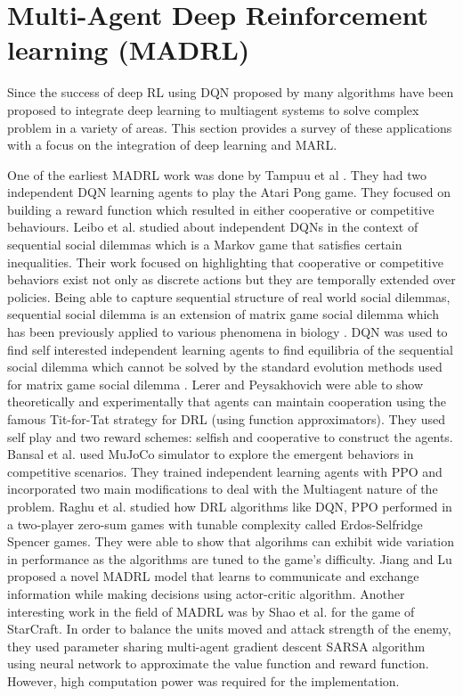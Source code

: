 \documentclass[12pt]{report}
\begin{document}
\section{Multi-Agent Deep Reinforcement learning (MADRL)}

Since the success of deep RL using DQN proposed by \cite{Kavukcuoglu} many algorithms have been proposed to integrate deep learning to multiagent systems to solve complex problem in a variety of areas. This section provides a survey of these applications with a focus on the integration of deep learning and MARL. 

One of the earliest MADRL work was done by Tampuu et al \cite{Tampuu}. They had two independent DQN learning agents to play the Atari Pong game. They focused on building a reward function which resulted in either cooperative or competitive behaviours. Leibo et al. \cite{Leibo} studied about independent DQNs in the context of sequential social dilemmas which is a Markov game that satisfies certain inequalities. Their work focused on highlighting that cooperative or competitive behaviors exist not only as discrete actions but they are temporally extended over policies. Being able to capture sequential structure of real world social dilemmas, sequential social dilemma is an extension of matrix game social dilemma which has been previously applied to various phenomena in biology \cite{Cote}. DQN was used to find self interested independent learning agents to find equilibria of the sequential social dilemma which cannot be solved by the standard evolution methods used for matrix game social dilemma \cite{Weiner}. Lerer and Peysakhovich \cite{Lerer} were able to show theoretically and experimentally that agents can maintain cooperation using the famous Tit-for-Tat strategy for DRL (using function approximators). They used self play and two reward schemes: selfish and cooperative to construct the agents. Bansal et al. \cite{Bansal} used MuJoCo simulator to explore the emergent behaviors in competitive scenarios. They trained independent learning agents with PPO and incorporated two main modifications to deal with the Multiagent nature of the problem. Raghu et al. \cite{Raghu} studied how DRL algorithms like DQN, PPO performed in a two-player zero-sum games with tunable complexity called Erdos-Selfridge Spencer games. They were able to show that algorihms can exhibit wide variation in performance as the algorithms are tuned to the game's difficulty. Jiang and Lu \cite{Jiang} proposed a novel MADRL model that learns to communicate and exchange information while making decisions using actor-critic algorithm. Another interesting work in the field of MADRL was by Shao et al. \cite{Shao} for the game of StarCraft. In order to balance the units moved and attack strength of the enemy, they used parameter sharing multi-agent gradient descent SARSA algorithm using neural network to approximate the value function and reward function. However, high computation power was required for the implementation. 
\end{document}
